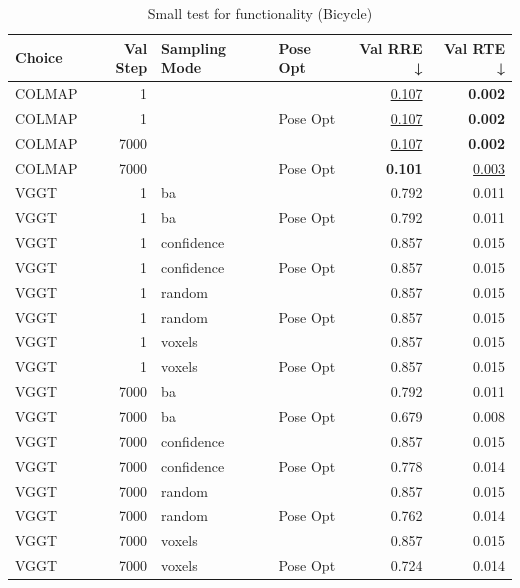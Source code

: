 \begin{table}[H]
\caption{Small test for functionality (Bicycle)}
\label{tab:99_test_bicycle}
\begin{tabular}{lrllrr}
\toprule
Choice & Val Step & Sampling Mode & Pose Opt & Val RRE ↓ & Val RTE ↓ \\
\midrule
COLMAP & 1 &  &  & \underline{0.107} & \textbf{0.002} \\
COLMAP & 1 &  & Pose Opt & \underline{0.107} & \textbf{0.002} \\
COLMAP & 7000 &  &  & \underline{0.107} & \textbf{0.002} \\
COLMAP & 7000 &  & Pose Opt & \textbf{0.101} & \underline{0.003} \\
VGGT & 1 & ba &  & 0.792 & 0.011 \\
VGGT & 1 & ba & Pose Opt & 0.792 & 0.011 \\
VGGT & 1 & confidence &  & 0.857 & 0.015 \\
VGGT & 1 & confidence & Pose Opt & 0.857 & 0.015 \\
VGGT & 1 & random &  & 0.857 & 0.015 \\
VGGT & 1 & random & Pose Opt & 0.857 & 0.015 \\
VGGT & 1 & voxels &  & 0.857 & 0.015 \\
VGGT & 1 & voxels & Pose Opt & 0.857 & 0.015 \\
VGGT & 7000 & ba &  & 0.792 & 0.011 \\
VGGT & 7000 & ba & Pose Opt & 0.679 & 0.008 \\
VGGT & 7000 & confidence &  & 0.857 & 0.015 \\
VGGT & 7000 & confidence & Pose Opt & 0.778 & 0.014 \\
VGGT & 7000 & random &  & 0.857 & 0.015 \\
VGGT & 7000 & random & Pose Opt & 0.762 & 0.014 \\
VGGT & 7000 & voxels &  & 0.857 & 0.015 \\
VGGT & 7000 & voxels & Pose Opt & 0.724 & 0.014 \\
\bottomrule
\end{tabular}
\end{table}
